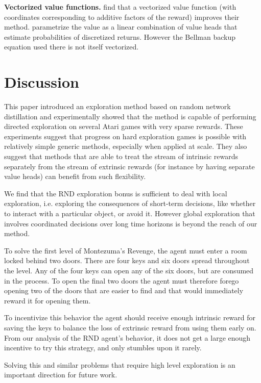 \documentclass{article} %
\begin{document}
\textbf{Vectorized value functions.} \cite{pong2018temporal} find that a vectorized value function (with coordinates corresponding to additive factors of the reward) improves their method. \cite{bellemare2017distributional} parametrize the value as a linear combination of value heads that estimate probabilities of discretized returns. However the Bellman backup equation used there is not itself vectorized.

\section{Discussion}
This paper introduced an exploration method based on random network distillation and experimentally showed that the method is capable of performing directed exploration on several Atari games with very sparse rewards. These experiments suggest that progress on hard exploration games is possible with relatively simple generic methods, especially when applied at scale. They also suggest that methods that are able to treat the stream of intrinsic rewards separately from the stream of extrinsic rewards (for instance by having separate value heads) can benefit from such flexibility.

We find that the RND exploration bonus is sufficient to deal with local exploration, i.e. exploring the consequences of short-term decisions, like whether to interact with a particular object, or avoid it. However global exploration that involves coordinated decisions over long time horizons is  beyond the reach of our method.

To solve the first level of Montezuma's Revenge, the agent must enter a room locked behind two doors. There are four keys and six doors spread throughout the level. Any of the four keys can open any of the six doors, but are consumed in the process. To open the final two doors the agent must therefore forego opening two of the doors that are easier to find and that would immediately reward it for opening them.

To incentivize this behavior the agent should receive enough intrinsic reward for saving the keys to balance the loss of extrinsic reward from using them early on. From our analysis of the RND agent's behavior, it does not get a large enough incentive to try this strategy, and only stumbles upon it rarely.

Solving this and similar problems that require high level exploration is an important direction for future work.



\end{document}
